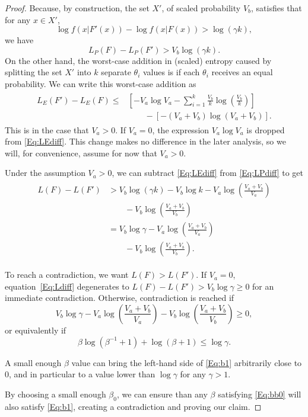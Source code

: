 \documentclass{IEEEtran}
\begin{document}
\begin{proof}
Because, by construction, the set $X'$, of scaled probability $V_b$, satisfies
that for any $x\in X'$,
\[
\log f(x|F'(x))-\log f(x|F(x))>\log (\gamma k),
\]
we have
\begin{equation}\label{Eq:LPdiff}
L_P(F)-L_P(F')>V_b \log (\gamma k).
\end{equation}
On the other hand, the worst-case addition in (scaled) entropy caused by
splitting the set $X'$ into $k$ separate $\theta_i$ values is if each
$\theta_i$ receives an equal probability. We can write this worst-case
addition as
\begin{align}\label{Eq:LEdiff}
\begin{split}
L_E(F')-L_E(F) \le & \left[-V_a \log V_a-\sum_{i=1}^{k}\frac{V_b}{k}\log\left(\frac{V_b}{k}\right)\right] \\
& \quad\quad -\left[-(V_a+V_b)\log(V_a+V_b)\right].
\end{split}
\end{align}
This is in the case that $V_a>0$. If $V_a=0$, the expression $V_a \log V_a$
is dropped from \eqref{Eq:LEdiff}. This change makes no difference in the later
analysis, so we will, for convenience, assume for now that $V_a>0$.

Under the assumption $V_a>0$, we can subtract \eqref{Eq:LEdiff}
from \eqref{Eq:LPdiff} to get
\begin{align}\label{Eq:Ldiff}
\begin{split}
L(F)-L(F') & > V_b \log(\gamma k)-V_b \log k -  V_a \log\left(\frac{V_a+V_b}{V_a}\right) \\
& \quad\quad - V_b \log\left(\frac{V_a+V_b}{V_b}\right) \\
&= V_b \log \gamma -  V_a \log\left(\frac{V_a+V_b}{V_a}\right) \\
& \quad\quad - V_b \log\left(\frac{V_a+V_b}{V_b}\right).
\end{split}
\end{align}

To reach a contradiction, we want $L(F)>L(F')$. If $V_a=0$,
equation~\eqref{Eq:Ldiff}
degenerates to $L(F)-L(F') > V_b \log \gamma \ge 0$ for an immediate
contradiction. Otherwise, contradiction is reached if
\[
V_b \log \gamma -  V_a \log\left(\frac{V_a+V_b}{V_a}\right) - V_b \log\left(\frac{V_a+V_b}{V_b}\right) \ge 0,
\]
or equivalently if
\begin{equation}\label{Eq:b1}
\beta\log(\beta^{-1}+1)+\log(\beta+1)\le \log \gamma.
\end{equation}

A small enough $\beta$ value can bring the left-hand side of \eqref{Eq:b1}
arbitrarily close to $0$, and in particular to a value lower
than $\log \gamma$ for any $\gamma>1$.

By choosing a small enough $\beta_0$, we can ensure than any $\beta$
satisfying \eqref{Eq:bb0} will also satisfy \eqref{Eq:b1},
creating a contradiction and proving our claim.
\end{proof}
\end{document}
